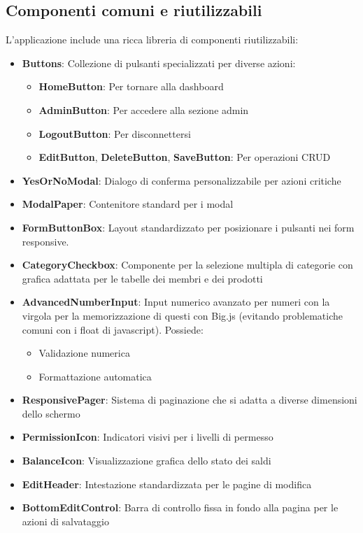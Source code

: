 \documentclass[11pt]{article}
\begin{document}
\subsection{Componenti comuni e riutilizzabili}
L'applicazione include una ricca libreria di componenti riutilizzabili:
\begin{itemize}
    \item \textbf{Buttons}: Collezione di pulsanti specializzati per diverse azioni:
    \begin{itemize}
        \item \textbf{HomeButton}: Per tornare alla dashboard
        \item \textbf{AdminButton}: Per accedere alla sezione admin
        \item \textbf{LogoutButton}: Per disconnettersi
        \item \textbf{EditButton}, \textbf{DeleteButton}, \textbf{SaveButton}: Per operazioni CRUD
    \end{itemize}

    \item \textbf{YesOrNoModal}: Dialogo di conferma personalizzabile per azioni critiche

    \item \textbf{ModalPaper}: Contenitore standard per i modal

    \item \textbf{FormButtonBox}: Layout standardizzato per posizionare i pulsanti nei form responsive.

    \item \textbf{CategoryCheckbox}: Componente per la selezione multipla di categorie con grafica adattata per le tabelle dei membri e dei prodotti

    \item \textbf{AdvancedNumberInput}: Input numerico avanzato per numeri con la virgola per la memorizzazione di questi con Big.js (evitando problematiche comuni con i float di javascript). Possiede:
    \begin{itemize}
        \item Validazione numerica
        \item Formattazione automatica
    \end{itemize}

    \item \textbf{ResponsivePager}: Sistema di paginazione che si adatta a diverse dimensioni dello schermo

    \item \textbf{PermissionIcon}: Indicatori visivi per i livelli di permesso

    \item \textbf{BalanceIcon}: Visualizzazione grafica dello stato dei saldi

    \item \textbf{EditHeader}: Intestazione standardizzata per le pagine di modifica

    \item \textbf{BottomEditControl}: Barra di controllo fissa in fondo alla pagina per le azioni di salvataggio
\end{itemize}
\end{document}
